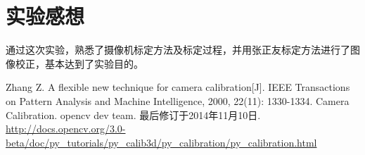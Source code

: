 \documentclass[a4paper, 12pt, UTF8]{article}
\begin{document}
\section{实验感想}

通过这次实验，熟悉了摄像机标定方法及标定过程，并用张正友标定方法进行了图像校正，基本达到了实验目的。


\renewcommand{\refname}{参考}
\begin{thebibliography}{9}
 Zhang Z. A flexible new technique for camera calibration[J]. IEEE Transactions on Pattern Analysis and Machine Intelligence, 2000, 22(11): 1330-1334.
 Camera Calibration. opencv dev team. 最后修订于2014年11月10日.  \url{http://docs.opencv.org/3.0-beta/doc/py_tutorials/py_calib3d/py_calibration/py_calibration.html}
\end{thebibliography}
\end{document}
